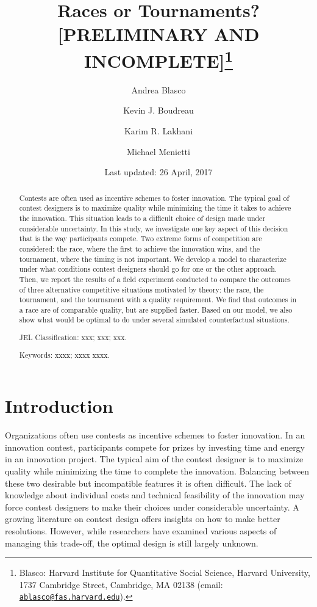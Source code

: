 \documentclass[12pt,]{article}
\title{Races or Tournaments? {[}PRELIMINARY AND INCOMPLETE{]}\thanks{Blasco: Harvard Institute for Quantitative Social Science, Harvard
University, 1737 Cambridge Street, Cambridge, MA 02138 (email:
\href{mailto:ablasco@fas.harvard.edu}{\nolinkurl{ablasco@fas.harvard.edu}}).}}
\author{Andrea Blasco \and Kevin J. Boudreau \and Karim R. Lakhani \and Michael Menietti}
\date{Last updated: 26 April, 2017}
\theoremstyle{plain} %
\begin{document}
\maketitle
\begin{abstract}
Contests are often used as incentive schemes to foster innovation. The
typical goal of contest designers is to maximize quality while
minimizing the time it takes to achieve the innovation. This situation
leads to a difficult choice of design made under considerable
uncertainty. In this study, we investigate one key aspect of this
decision that is the way participants compete. Two extreme forms of
competition are considered: the race, where the first to achieve the
innovation wins, and the tournament, where the timing is not important.
We develop a model to characterize under what conditions contest
designers should go for one or the other approach. Then, we report the
results of a field experiment conducted to compare the outcomes of three
alternative competitive situations motivated by theory: the race, the
tournament, and the tournament with a quality requirement. We find that
outcomes in a race are of comparable quality, but are supplied faster.
Based on our model, we also show what would be optimal to do under
several simulated counterfactual situations.

\smallskip\noindent 
JEL Classification: xxx; xxx; xxx.

\smallskip\noindent 
Keywords: xxxx; xxxx xxxx.
\end{abstract}


\clearpage
\tableofcontents
\setcounter{tocdepth}{2}
\clearpage

\section{Introduction}\label{introduction}

Organizations often use contests as incentive schemes to foster
innovation. In an innovation contest, participants compete for prizes by
investing time and energy in an innovation project. The typical aim of
the contest designer is to maximize quality while minimizing the time to
complete the innovation. Balancing between these two desirable but
incompatible features it is often difficult. The lack of knowledge about
individual costs and technical feasibility of the innovation may force
contest designers to make their choices under considerable uncertainty.
A growing literature on contest design offers insights on how to make
better resolutions. However, while researchers have examined various
aspects of managing this trade-off, the optimal design is still largely
unknown.
\end{document}
